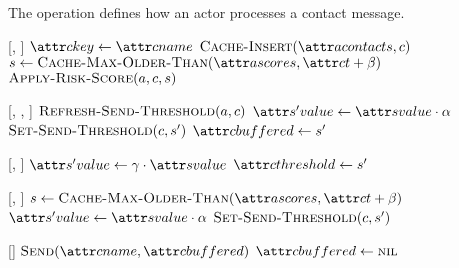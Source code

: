 The \cHandleContact{} operation defines how an actor processes a contact message.
%
\begin{function}{\nHandleContact}[\vActor, \vContact]
    \State $\aContactKey \assign \aContactName$
    \State $\cCacheInsert[\aActorContacts, \vContact]$
    \State $\vScore \assign \cCacheMaxOlderThan[\aActorScores, \aContactTime + \pTimeBuffer]$
    \State $\cApplyRiskScore[\vActor, \vContact, \vScore]$
  \EndIf
\end{function}
%
\begin{function}{\nApplyRiskScore}[\vActor, \vContact, \vScore]
  \State $\cRefreshSendThreshold[\vActor, \vContact]$
  \If{$\aContactThresholdValue < \aScoreValue \AND \aContactTime + \pTimeBuffer > \aScoreTime$}
    \State $\aNewScoreValue \assign \aScoreValue \cdot \pTransmissionRate$
    \State $\cSetSendThreshold[\vContact, \vNewScore]$
    \If{$\aContactName \notEquals \aScoreSender$}
      \State $\aContactBuffered \assign \vNewScore$
    \EndIf
  \EndIf
\end{function}
%
\begin{function}{\nSetSendThreshold}[\vContact, \vScore]
    \State $\aNewScoreValue \assign \pSendCoefficient \cdot \aScoreValue$
    \State $\aContactThreshold \assign \vNewScore$
\end{function}
%
\begin{function}{\nRefreshSendThreshold}[\vActor, \vContact]
        \State $\vScore \assign \cCacheMaxOlderThan[\aActorScores, \aContactTime + \pTimeBuffer]$
        \State $\aNewScoreValue \assign \aScoreValue \cdot \pTransmissionRate$
        \State $\cSetSendThreshold[\vContact, \vNewScore]$    
    \EndIf
\end{function}
%
\begin{function}{\nHandleFlushTimeout}[\vActor]
  \ForEach{$\vContact \in \aActorContacts$}
    \If{$\aContactBuffered \notEquals \nil$}
      \State $\cSend[\aContactName, \aContactBuffered]$
      \State $\aContactBuffered \assign \nil$
    \EndIf
  \EndFor
\end{function}


